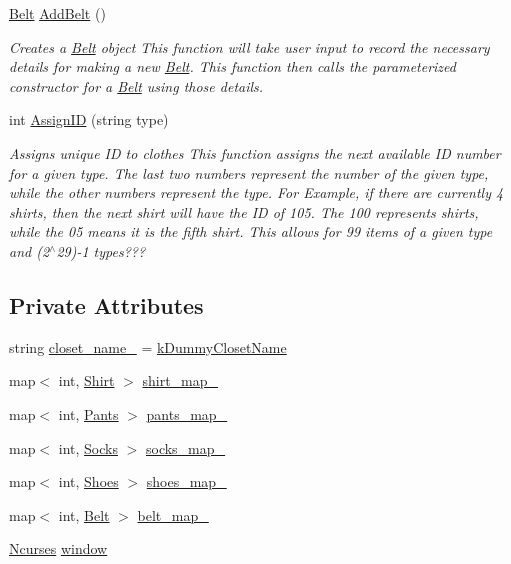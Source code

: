 \begin{DoxyCompactItemize}
\mbox{\hyperlink{classBelt}{Belt}} \mbox{\hyperlink{classCloset_ad81782f2bb110f3a0a635a5ac1f929eb}{Add\+Belt}} ()
\begin{DoxyCompactList}\small\item\em Creates a \textquotesingle{}\mbox{\hyperlink{classBelt}{Belt}}\textquotesingle{} object  This function will take user input to record the necessary details for making a new \textquotesingle{}\mbox{\hyperlink{classBelt}{Belt}}\textquotesingle{}. This function then calls the parameterized constructor for a \textquotesingle{}\mbox{\hyperlink{classBelt}{Belt}}\textquotesingle{} using those details. \end{DoxyCompactList}\item 
int \mbox{\hyperlink{classCloset_afabc27d621abdf0089a6b3027ea8f470}{Assign\+ID}} (string type)
\begin{DoxyCompactList}\small\item\em Assigns unique ID to clothes  This function assigns the next available ID number for a given type. The last two numbers represent the number of the given type, while the other numbers represent the type. For Example, if there are currently 4 shirts, then the next shirt will have the ID of 105. The 100 represents shirts, while the 05 means it is the fifth shirt. This allows for 99 items of a given type and (2$^\wedge$29)-\/1 types??? \end{DoxyCompactList}\end{DoxyCompactItemize}
\subsection*{Private Attributes}
\begin{DoxyCompactItemize}
\item 
string \mbox{\hyperlink{classCloset_a3c06676b90e6ebe31d6dd276f2f0bcef}{closet\+\_\+name\+\_\+}} = \mbox{\hyperlink{myCloset_8h_abe246d8af0c0b6020aa175c2874b59be}{k\+Dummy\+Closet\+Name}}
\item 
map$<$ int, \mbox{\hyperlink{classShirt}{Shirt}} $>$ \mbox{\hyperlink{classCloset_a8126a023a2777b84b23436da8d1f4b35}{shirt\+\_\+map\+\_\+}}
\item 
map$<$ int, \mbox{\hyperlink{classPants}{Pants}} $>$ \mbox{\hyperlink{classCloset_a8be78859dfab9e2aa09bfbbb8f191dab}{pants\+\_\+map\+\_\+}}
\item 
map$<$ int, \mbox{\hyperlink{classSocks}{Socks}} $>$ \mbox{\hyperlink{classCloset_a33a48dfc5ef542261bb0dd373f899f9e}{socks\+\_\+map\+\_\+}}
\item 
map$<$ int, \mbox{\hyperlink{classShoes}{Shoes}} $>$ \mbox{\hyperlink{classCloset_ab1e1ce9110a044c90244407f0f6f92c4}{shoes\+\_\+map\+\_\+}}
\item 
map$<$ int, \mbox{\hyperlink{classBelt}{Belt}} $>$ \mbox{\hyperlink{classCloset_a0631fe46e3c955109a613e1cd1d2cb52}{belt\+\_\+map\+\_\+}}
\item 
\mbox{\hyperlink{classNcurses}{Ncurses}} \mbox{\hyperlink{classCloset_af1eb4f786cc4eccd3018b90632236a93}{window}}
\end{DoxyCompactItemize}


